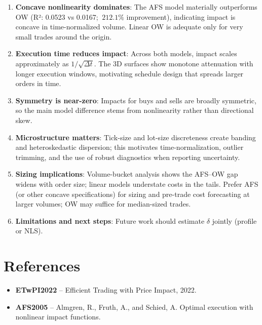 \documentclass{article}
\begin{document}
\begin{enumerate}
    \item \textbf{Concave nonlinearity dominates}: The AFS model materially outperforms OW (R²: 0.0523 vs 0.0167; \(~\!212.1\%\) improvement), indicating impact is concave in time-normalized volume. Linear OW is adequate only for very small trades around the origin.

    \item \textbf{Execution time reduces impact}: Across both models, impact scales approximately as $1/\sqrt{\Delta t}$. The 3D surfaces show monotone attenuation with longer execution windows, motivating schedule design that spreads larger orders in time.

    \item \textbf{Symmetry is near-zero}: Impacts for buys and sells are broadly symmetric, so the main model difference stems from nonlinearity rather than directional skew.

    \item \textbf{Microstructure matters}: Tick-size and lot-size discreteness create banding and heteroskedastic dispersion; this motivates time-normalization, outlier trimming, and the use of robust diagnostics when reporting uncertainty.

    \item \textbf{Sizing implications}: Volume-bucket analysis shows the AFS–OW gap widens with order size; linear models understate costs in the tails. Prefer AFS (or other concave specifications) for sizing and pre-trade cost forecasting at larger volumes; OW may suffice for median-sized trades.

    \item \textbf{Limitations and next steps}: Future work should estimate $\delta$ jointly (profile or NLS).
\end{enumerate}


\section{References}
\begin{itemize}
    \item \textbf{ETwPI2022} – Efficient Trading with Price Impact, 2022.
    \item \textbf{AFS2005} – Almgren, R., Fruth, A., and Schied, A. Optimal execution with nonlinear impact functions.
\end{itemize}
\end{document}
